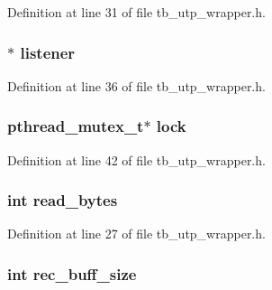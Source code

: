 Definition at line 31 of file tb\-\_\-utp\-\_\-wrapper.\-h.

\hypertarget{structtb__utp__wrapper__t_a0c02803e7ead869ea25f956fb4619873}{
\subsubsection[{listener}]{$\ast$ listener}}\label{structtb__utp__wrapper__t_a0c02803e7ead869ea25f956fb4619873}


Definition at line 36 of file tb\-\_\-utp\-\_\-wrapper.\-h.

\hypertarget{structtb__utp__wrapper__t_a33586b4184d23f2b8f4df153ec23af13}{
\subsubsection[{lock}]{\setlength{\rightskip}{0pt plus 5cm}pthread\-\_\-mutex\-\_\-t$\ast$ lock}}\label{structtb__utp__wrapper__t_a33586b4184d23f2b8f4df153ec23af13}


Definition at line 42 of file tb\-\_\-utp\-\_\-wrapper.\-h.

\hypertarget{structtb__utp__wrapper__t_aeb56438a9cac1febce2dcddd6c404759}{
\subsubsection[{read\-\_\-bytes}]{\setlength{\rightskip}{0pt plus 5cm}int read\-\_\-bytes}}\label{structtb__utp__wrapper__t_aeb56438a9cac1febce2dcddd6c404759}


Definition at line 27 of file tb\-\_\-utp\-\_\-wrapper.\-h.

\hypertarget{structtb__utp__wrapper__t_a57c1edf513c216e498e37e3428180480}{
\subsubsection[{rec\-\_\-buff\-\_\-size}]{\setlength{\rightskip}{0pt plus 5cm}int rec\-\_\-buff\-\_\-size}}\label{structtb__utp__wrapper__t_a57c1edf513c216e498e37e3428180480}


